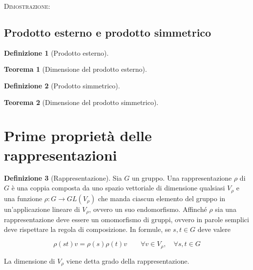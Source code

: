 \documentclass[11pt]{article}
\theoremstyle{plain}
\newtheorem{thm}{Teorema}[section]
\theoremstyle{definition}
\newtheorem{defn}{Definizione}[section]
\theoremstyle{remark}
\begin{document}
\textsc{Dimostrazione:}


\subsection{Prodotto esterno e prodotto simmetrico}



\begin{defn}[Prodotto esterno]


\label{defn:prodotto esterno}
\end{defn}





\begin{thm}[Dimensione del prodotto esterno]



\label{thm:prodotto esterno}
\end{thm}








\begin{defn}[Prodotto simmetrico]


\label{defn:prodotto simmetrico}
\end{defn}





\begin{thm}[Dimensione del prodotto simmetrico]



\label{thm:prodotto simmetrico}
\end{thm}









\newpage
\section{Prime proprietà delle rappresentazioni}

\begin{defn}[Rappresentazione] Sia $G$ un gruppo. Una rappresentazione $\rho$ di $G$ è una coppia composta da uno spazio vettoriale di dimensione qualsiasi $V_\rho$ e una funzione $\rho: G \to GL(V_\rho)$ che manda ciascun elemento del gruppo in un'applicazione lineare di $V_\rho$, ovvero un suo endomorfismo. Affinché $\rho$ sia una rappresentazione deve essere un omomorfismo di gruppi, ovvero in parole semplici deve rispettare la regola di composizione. In formule, se $s, t \in G$ deve valere

\[ \rho(st) v = \rho(s)\rho(t) v \qquad \forall v \in V_\rho, \quad \forall s,t \in G\]

La dimensione di $V_\rho$ viene detta grado della rappresentazione.

\end{defn}
\end{document}
